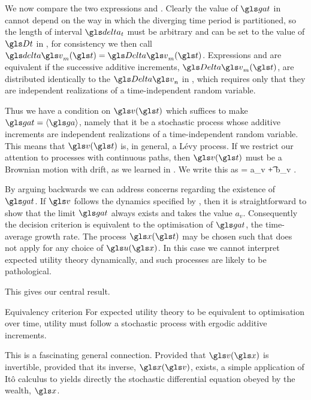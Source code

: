 We now compare the two expressions  and . 
Clearly the value of $\gat$ in  cannot depend on the way 
in which the diverging time period is partitioned, so the length of interval $\dt$ 
must be arbitrary and can be set to the value of $\Dt$ in , for
consistency we then call $\d\gv_m(\t)=\Dv_m(\t)$. 
Expressions  and  are equivalent 
if the successive additive increments, 
$\Dv_m(\t)$, are distributed identically to the $\Dv_n$ in , 
which requires only that they are independent realizations of a time-independent random variable.

Thus we have a condition on $\gv(\t)$ which suffices to make $\gat=\ave{\gad}$, 
namely that it be a stochastic process whose additive increments are independent realizations of a time-independent random variable. This means that $\gv(\t)$ is, in general, a L\'evy process. 
If we restrict our attention to processes with 
continuous paths, then $\gv(\t)$ must be a Brownian motion with drift, as we learned in . We write this as
\be
\gd\gv = a_v \gd\t + b_v \gd\gW.
\ee

By arguing backwards we can address concerns regarding the
existence of $\gat$. If $\gv$ follows the dynamics specified by 
, then it is straightforward to show that the limit 
$\gat$ always exists and takes the value $a_v$. Consequently the 
decision criterion  is equivalent to the optimisation 
of $\gat$, the time-average growth rate. The process $\x(\t)$ may be
chosen such that  does not apply for any choice of $\gu(\x)$. 
In this case we cannot interpret expected utility theory dynamically,
and such processes are likely to be pathological. 

This gives our central result.
\begin{keypts}{Equivalency criterion}
For expected utility theory to be equivalent to 
optimisation over time, utility must follow a stochastic process 
with ergodic additive increments.
\end{keypts}

This is a fascinating general connection. Provided that  
$\gv(\x)$ is invertible, \ie provided that its inverse, $\x(\gv)$, exists, 
a simple application of It\^o calculus to  yields directly the 
stochastic differential equation obeyed by the wealth, $\x$. 

